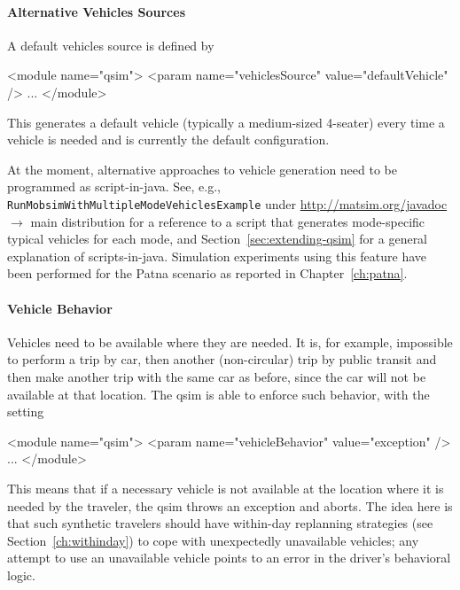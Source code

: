 \paragraph{Alternative Vehicles Sources}

A default vehicles source is defined by
\begin{xml}
<module name="qsim">
   <param name="vehiclesSource" value="defaultVehicle" />
   ...
</module>
\end{xml}
This generates a default vehicle (typically a medium-sized 4-seater) every time a vehicle is needed and is currently the default configuration.

At the moment, alternative approaches to vehicle generation need to be programmed as script-in-\gls{java}.  
See, e.g., 
\lstinline{RunMobsimWithMultipleModeVehiclesExample} under \url{http://matsim.org/javadoc} $\to$ main distribution
for a reference to a script that generates mode-specific typical vehicles for each mode, and Section~\ref{sec:extending-qsim} for a general explanation of scripts-in-\gls{java}.
Simulation experiments 
using this feature have been performed for the Patna scenario as reported in Chapter~\ref{ch:patna}.


\paragraph{Vehicle Behavior}

Vehicles need to be available where they are needed.  It is, for example, impossible to perform a trip by car, then another (non-circular) trip by public transit and then make another trip with the same car as before, since the car will not be available at that location.  The \gls{qsim} is able to enforce such behavior, with the setting
\begin{xml}
<module name="qsim">
   <param name="vehicleBehavior" value="exception" />
   ...
</module>
\end{xml}
This means that if a necessary vehicle is not available at the location where it is needed by the traveler, the \gls{qsim} throws an exception and aborts.  The idea here is that such synthetic travelers should have within-day replanning strategies (see Section~\ref{ch:withinday}) to cope with unexpectedly unavailable vehicles; any attempt to use an unavailable vehicle points to an error in the driver's behavioral logic.

